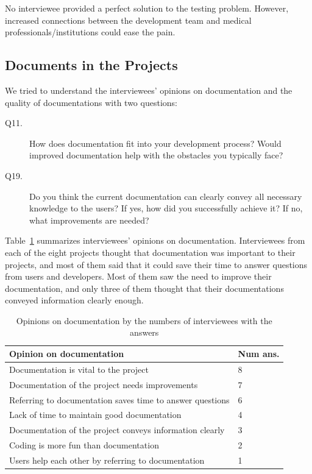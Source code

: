\documentclass[final, 3p, times, authoryear]{elsarticle}
\begin{document}
No interviewee provided a perfect solution to the testing problem. However,
increased connections between the development team and medical
professionals/institutions could ease the pain.

\subsection{Documents in the Projects} \label{sec_interview_documents}

We tried to understand the interviewees' opinions on documentation and the
quality of documentations with two questions:

\begin{description}
\item[Q11.] How does documentation fit into your development process? Would
improved documentation help with the obstacles you typically face?
\item[Q19.] Do you think the current documentation can clearly convey all
necessary knowledge to the users? If yes, how did you successfully achieve it?
If no, what improvements are needed?
\end{description}

Table~\ref{tab_opinion_doc} summarizes interviewees' opinions on documentation.
Interviewees from each of the eight projects thought that documentation was
important to their projects, and most of them said that it could save their time
to answer questions from users and developers. Most of them saw the need to
improve their documentation, and only three of them thought that their
documentations conveyed information clearly enough. 

\begin{table}[!ht]
\centering
\begin{tabular}{ll}
\hline
Opinion on documentation & Num ans. \\ \hline
Documentation is vital to the project& 8 \\
Documentation of the project needs improvements & 7 \\
Referring to documentation saves time to answer questions & 6 \\
Lack of time to maintain good documentation & 4 \\
Documentation of the project conveys information clearly & 3 \\
Coding is more fun than documentation & 2 \\
Users help each other by referring to documentation & 1 \\ \hline
\end{tabular}
\caption{\label{tab_opinion_doc}Opinions on documentation by the numbers of
interviewees with the answers}
\end{table}
\end{document}
